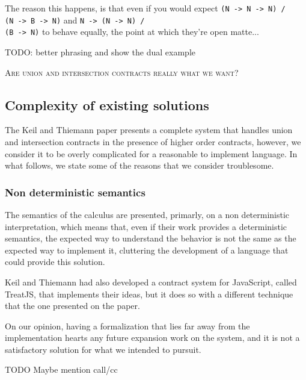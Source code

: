 The reason this happens, is that even if you would expect
\texttt{(N -> N -> N) /\\ (N -> B -> N)}
and \texttt{N -> (N -> N) /\\ (B -> N)} to behave equally, the point at which
they're open matte...


TODO: better phrasing and show the dual example

\textsc{Are union and intersection contracts really what we want?}

\subsection{Complexity of existing solutions}

The Keil and Thiemann paper presents a complete system that handles union and intersection
contracts in the presence of higher order contracts, however, we consider it to be overly
complicated for a reasonable to implement language.
In what follows, we state some of the reasons that we consider troublesome.

\subsubsection{Non deterministic semantics}

The semantics of the calculus are presented, primarly, on a non deterministic interpretation,
which means that, even if their work provides a deterministic semantics,
the expected way to understand
the behavior is not the same as the expected way to implement it, cluttering the development
of a language that could provide this solution.

Keil and Thiemann had also developed a contract system for JavaScript, called TreatJS, that
implements their ideas, but it does so with a different technique that the one presented
on the paper.

On our opinion, having a formalization that lies far away from the implementation
hearts any future expansion work on the system, and it is not a satisfactory solution
for what we intended to pursuit.


TODO Maybe mention call/cc



